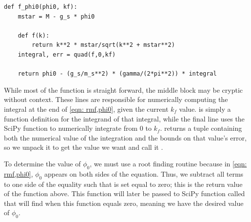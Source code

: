 \begin{lstlisting}
def f_phi0(phi0, kf):
    mstar = M - g_s * phi0

    def f(k):
        return k**2 * mstar/sqrt(k**2 + mstar**2)
    integral, err = quad(f,0,kf)

    return phi0 - (g_s/m_s**2) * (gamma/(2*pi**2)) * integral
\end{lstlisting}

While most of the function is straight forward, the middle block may be cryptic without context. These lines are responsible for numerically computing the integral at the end of \eqref{eqn: rmf,phi0}, given the current $k_f$ value.  is simply a function definition for the integrand of that integral, while the final line uses the SciPy function  to numerically integrate  from $0$ to $k_f$.  returns a tuple containing both the numerical value of the integration and the bounds on that value's error, so we unpack it to get the value we want and call it . 

To determine the value of $\phi_0$, we must use a root finding routine because in \eqref{eqn: rmf,phi0}, $\phi_0$ appears on both sides of the equation. Thus, we subtract all terms to one side of the equality such that is set equal to zero; this is the return value of the  function above. This function will later be passed to SciPy function called  that will find when this function equals zero, meaning we have the desired value of $\phi_0$.

